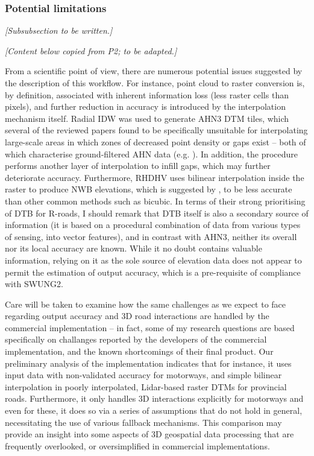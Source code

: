 \subsubsection{Potential limitations}

\textit{[Subsubsection to be written.]}

\textit{[Content below copied from P2; to be adapted.]}

From a scientific point of view, there are numerous potential issues suggested by the description of this workflow. For instance, point cloud to raster conversion is, by definition, associated with inherent information loss (less raster cells than pixels), and further reduction in accuracy is introduced by the interpolation mechanism itself. Radial IDW was used to generate AHN3 DTM tiles, which several of the reviewed papers found to be specifically unsuitable for interpolating large-scale areas in which zones of decreased point density or gaps exist – both of which characterise ground-filtered AHN data (e.g. \cite{guo_etal_2010}). In addition, the procedure performs another layer of interpolation to infill gaps, which may further deteriorate accuracy. Furthermore, RHDHV uses bilinear interpolation inside the raster to produce NWB elevations, which is suggested by \cite{shi_etal_2005}, to be less accurate than other common methods such as bicubic. In terms of their strong prioritising of DTB for R-roads, I should remark that DTB itself is also a secondary source of information (it is based on a procedural combination of data from various types of sensing, into vector features), and in contrast with AHN3, neither its overall nor its local accuracy are known. While it no doubt contains valuable information, relying on it as the sole source of elevation data does not appear to permit the estimation of output accuracy, which is a pre-requisite of compliance with SWUNG2.

Care will be taken to examine how the same challenges as we expect to face regarding output accuracy and 3D road interactions are handled by the commercial implementation – in fact, some of my research questions are based specifically on challanges reported by the developers of the commercial implementation, and the known shortcomings of their final product. Our preliminary analysis of the implementation indicates that for instance, it uses input data with non-validated accuracy for motorways, and simple bilinear interpolation in poorly interpolated, Lidar-based raster DTMs for provincial roads. Furthermore, it only handles 3D interactions explicitly for motorways and even for these, it does so via a series of assumptions that do not hold in general, necessitating the use of various fallback mechanisms. This comparison may provide an insight into some aspects of 3D geospatial data processing that are frequently overlooked, or oversimplified in commercial implementations.
